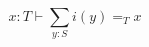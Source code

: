 \begin{equation}\label{eq:structural_subtyping}
    x : T \vdash \sum_{y: S} i(y) =_T x  
\end{equation}